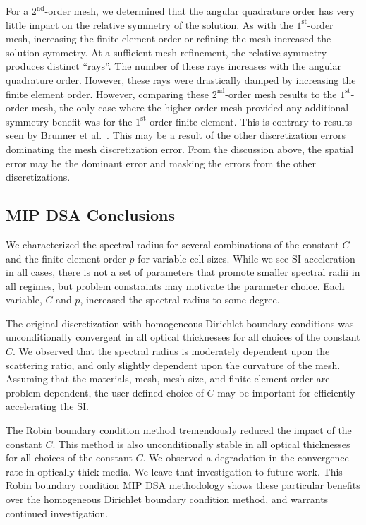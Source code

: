 \documentclass[12pt]{article}
\begin{document}
For a $2^\text{nd}$-order mesh, we determined that the angular quadrature order has very little impact on the relative symmetry of the solution. As with the $1^\text{st}$-order mesh, increasing the finite element order or refining the mesh increased the solution symmetry. At a sufficient mesh refinement, the relative symmetry produces distinct ``rays''. The number of these rays increases with the angular quadrature order. However, these rays were drastically damped by increasing the finite element order. However, comparing these $2^\text{nd}$-order mesh results to the $1^\text{st}$-order mesh, the only case where the higher-order mesh provided any additional symmetry benefit was for the $1^\text{st}$-order finite element. This is contrary to results seen by Brunner et al.~\cite{BrunnerSphericalsymmetry}. This may be a result of the other discretization errors dominating the mesh discretization error. From the discussion above, the spatial error may be the dominant error and masking the errors from the other discretizations.

\subsection{MIP DSA Conclusions}
\label{sec:MIPDSAConclusions}
We characterized the spectral radius for several combinations of the constant $C$ and the finite element order $p$ for variable cell sizes. While we see SI acceleration in all cases, there is not a set of parameters that promote smaller spectral radii in all regimes, but problem constraints may motivate the parameter choice. Each variable, $C$ and $p$, increased the spectral radius to some degree.

The original discretization with homogeneous Dirichlet boundary conditions was unconditionally convergent in all optical thicknesses for all choices of the constant $C$. We observed that the spectral radius is moderately dependent upon the scattering ratio, and only slightly dependent upon the curvature of the mesh. Assuming that the materials, mesh, mesh size, and finite element order are problem dependent, the user defined choice of $C$ may be important for efficiently accelerating the SI.

The Robin boundary condition method tremendously reduced the impact of the constant $C$. This method is also unconditionally stable in all optical thicknesses for all choices of the constant $C$. We observed a degradation in the convergence rate in optically thick media. We leave that investigation to future work. This Robin boundary condition MIP DSA methodology shows these particular benefits over the homogeneous Dirichlet boundary condition method, and warrants continued investigation.
\end{document}

